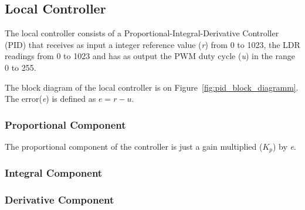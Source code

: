 

\subsection{Local Controller}
\label{sec:LocalController}

The local controller consists of a Proportional-Integral-Derivative Controller (PID) that receives as input a integer reference value (\emph{r}) from 0 to 1023, the LDR readings from 0 to 1023 and has as output the PWM duty cycle (\emph{u}) in the range 0 to 255.

The block diagram of the local controller is on Figure~\ref{fig:pid_block_diagramm}. The error(\emph{e}) is defined as $e = r - u$.

\subsubsection{Proportional Component}
\label{sub:ProportionalComponent}

The proportional component of the controller is just a gain multiplied (\emph{$K_p$}) by \emph{e}.

\subsubsection{Integral Component}
\label{sub:IntegralComponent}

\subsubsection{Derivative Component}
\label{sub:Derivative Component}

